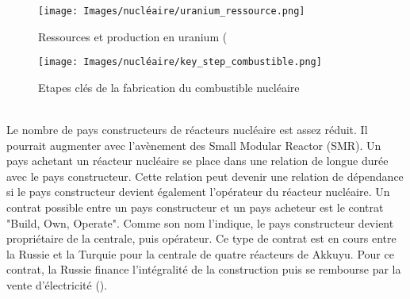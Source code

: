 \begin{figure}[!b]
    \centering
    \texttt{[image: Images/nucléaire/uranium\_ressource.png]}
    \caption{Ressources et production en uranium (\cite{meyer_les_2021}}
    \label{fig:uranium}
\end{figure}
\begin{figure}[!t]
    \centering
    \texttt{[image: Images/nucléaire/key\_step\_combustible.png]}
    \caption{Etapes clés de la fabrication du combustible nucléaire}
    \label{fig:combustible}
\end{figure}
~\\
Le nombre de pays constructeurs de réacteurs nucléaire est assez réduit. Il pourrait augmenter avec l'avènement des Small Modular Reactor (SMR). Un pays achetant un réacteur nucléaire se place dans une relation de longue durée avec le pays constructeur. Cette relation peut devenir une relation de dépendance si le pays constructeur devient également l'opérateur du réacteur nucléaire.\smallbreak
Un contrat possible entre un pays constructeur et un pays acheteur est le contrat "Build, Own, Operate". Comme son nom l'indique, le pays constructeur devient propriétaire de la centrale, puis opérateur. Ce type de contrat est en cours entre la Russie et la Turquie pour la centrale de quatre réacteurs de Akkuyu. Pour ce contrat, la Russie finance l'intégralité de la construction puis se rembourse par la vente d'électricité (\cite{meyer_les_2021}).